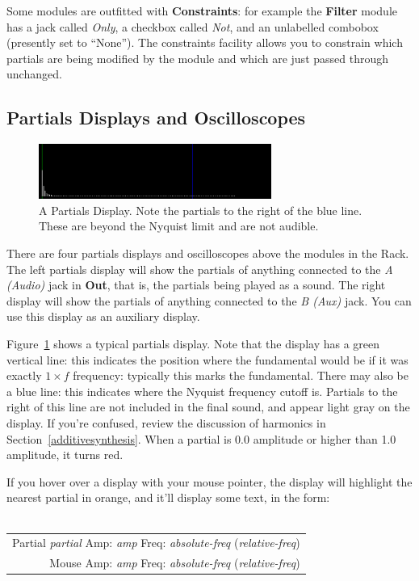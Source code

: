 \documentclass{article}
\begin{document}
Some modules are outfitted with {\bf Constraints}: for example the {\bf Filter} module has a jack called {\it Only}, a checkbox called {\it Not}, and an unlabelled combobox (presently set to ``None'').  The constraints facility allows you to constrain which partials are being modified by the module and which are just passed through unchanged. 

\subsection{Partials Displays and Oscilloscopes}

\begin{figure}
\vspace{-1em}
\includegraphics[width=3in]{display}
\caption{A Partials Display.  Note the partials to the right of the blue line.  These are beyond the Nyquist limit and are not audible.}
\label{display}
\end{figure}

There are four partials displays and oscilloscopes above the modules in the Rack.  The left partials display will show the partials of anything connected to the {\it A (Audio)} jack in {\bf Out}, that is, the partials being played as a sound.  The right display will show the partials of anything connected to the {\it B (Aux)} jack.  You can use this display as an auxiliary display.

Figure~\ref{display} shows a typical partials display.  Note that the display has a green vertical line: this indicates the position where the fundamental would be if it was exactly \(1\times f\) frequency: typically this marks the fundamental.  There may also be a blue line: this indicates where the Nyquist frequency cutoff is. Partials to the right of this line are not included in the final sound, and appear light gray on the display.  If you're confused, review the discussion of harmonics in Section~\ref{additivesynthesis}.  When a partial is 0.0 amplitude or higher than 1.0 amplitude, it turns red.

If you hover over a display with your mouse pointer, the display will highlight the nearest partial in orange, and it'll display some text, in the form:\\
\\
\begin{tabular}{@{\hspace{1in}}r}
Partial {\it partial}  Amp: {\it amp}  Freq: {\it absolute-freq} ({\it relative-freq})\\
Mouse  Amp: {\it amp}  Freq: {\it absolute-freq} ({\it relative-freq})\\
\end{tabular}\\
\end{document}
